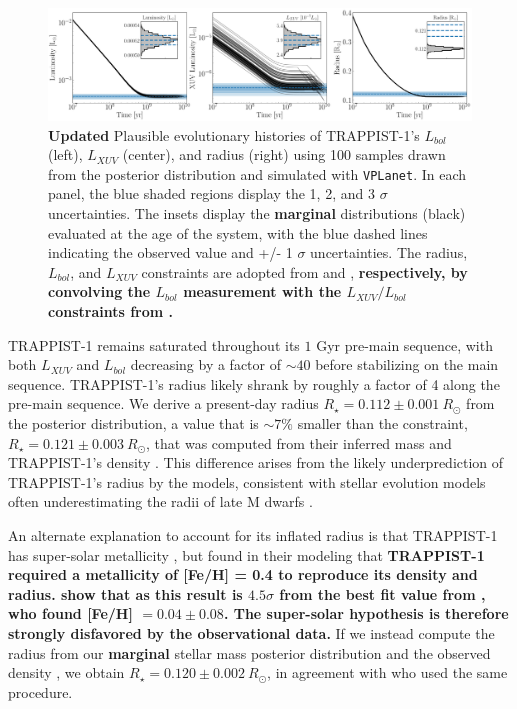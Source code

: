 \documentclass[twocolumn]{aastex62}
\newcommand{\xxx}[1]{{\textbf{#1}}}
\newcommand{\vplanet}[0]{\texttt{VPLanet}\xspace}
\begin{document}
\begin{figure}[t]
	\includegraphics[width=\textwidth]{../Analysis/Evol/trappist1Evol.pdf}
   \caption{\xxx{Updated} Plausible evolutionary histories of TRAPPIST-1's $L_{bol}$ (left), $L_{XUV}$ (center), and radius (right) using 100 samples drawn from the posterior distribution and simulated with \vplanet. In each panel, the blue shaded regions display the 1, 2, and 3 $\sigma$ uncertainties. The insets display the \xxx{marginal} distributions (black) evaluated at the age of the system, with the blue dashed lines indicating the observed value and +/- 1 $\sigma$ uncertainties. The radius, $L_{bol}$, and $L_{XUV}$ constraints are adopted from \citet{vanGrootel2018} and \citet{Wheatley2017}, \xxx{respectively, by convolving the \citet{vanGrootel2018} $L_{bol}$ measurement with the $L_{XUV}/L_{bol}$ constraints from \citet{Wheatley2017}.}}%
    \label{fig:evol}%
\end{figure}

TRAPPIST-1 remains saturated throughout its $1$ Gyr pre-main sequence, with both $L_{XUV}$ and $L_{bol}$ decreasing by a factor of ${\sim}40$ before stabilizing on the main sequence. TRAPPIST-1's radius likely shrank by roughly a factor of 4 along the pre-main sequence. We derive a present-day radius $R_{\star} = 0.112 \pm{0.001} \ R_{\odot}$ from the posterior distribution, a value that is ${\sim} 7\%$ smaller than the \citet{vanGrootel2018} constraint, $R_{\star} = 0.121 \pm {0.003} \ R_{\odot}$, that was computed from their inferred mass and TRAPPIST-1's density \citep{Delrez2018}. This difference arises from the likely underprediction of TRAPPIST-1's radius by the \citet{Baraffe2015} models, consistent with stellar evolution models often underestimating the radii of late M dwarfs \citep{Reid2005,Spada2013}. 

An alternate explanation to account for its inflated radius is that TRAPPIST-1 has super-solar metallicity \citep{Burgasser2017,vanGrootel2018}, but \citet{vanGrootel2018} found in their modeling that \xxx{TRAPPIST-1 required a metallicity of [Fe/H] = 0.4 to reproduce its density and radius. \citet{vanGrootel2018} show that as this result is $4.5\sigma$ from the best fit value from \citet{Gillon2016}, who found [Fe/H] $= 0.04 \pm{0.08}$. The super-solar hypothesis is therefore strongly disfavored by the observational data.} If we instead compute the radius from our \xxx{marginal} stellar mass posterior distribution and the observed density \citep{Delrez2018}, we obtain $R_{\star} = 0.120 \pm{0.002} \ R_{\odot}$, in agreement with \citet{vanGrootel2018} who used the same procedure.
\end{document}
